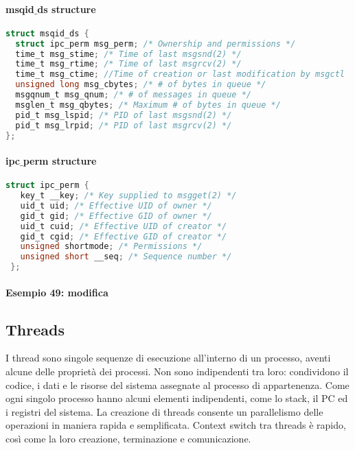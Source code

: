             \paragraph{msqid$\_$ds structure}\hfill \break
        \begin{lstlisting}[language=C]
struct msqid_ds {
  struct ipc_perm msg_perm; /* Ownership and permissions */
  time_t msg_stime; /* Time of last msgsnd(2) */
  time_t msg_rtime; /* Time of last msgrcv(2) */
  time_t msg_ctime; //Time of creation or last modification by msgctl
  unsigned long msg_cbytes; /* # of bytes in queue */
  msgqnum_t msg_qnum; /* # of messages in queue */
  msglen_t msg_qbytes; /* Maximum # of bytes in queue */
  pid_t msg_lspid; /* PID of last msgsnd(2) */
  pid_t msg_lrpid; /* PID of last msgrcv(2) */
};
        \end{lstlisting}
            \paragraph{ipc$\_$perm structure}\hfill \break
        \begin{lstlisting}[language=C]
 struct ipc_perm {
   key_t __key; /* Key supplied to msgget(2) */
   uid_t uid; /* Effective UID of owner */
   gid_t gid; /* Effective GID of owner */
   uid_t cuid; /* Effective UID of creator */
   gid_t cgid; /* Effective GID of creator */
   unsigned shortmode; /* Permissions */
   unsigned short __seq; /* Sequence number */
 };     
        \end{lstlisting}
        \paragraph{Esempio 49: modifica}\hfill \break
        
    \subsection{Threads}
    I thread sono singole sequenze di esecuzione all'interno di un processo, aventi alcune delle proprietà dei processi. Non sono indipendenti tra loro: condividono il codice, i dati e le risorse del sistema assegnate al processo di appartenenza. Come ogni singolo processo hanno alcuni elementi indipendenti, come lo stack, il PC ed i registri del sistema. La creazione di threads consente un parallelismo delle operazioni in maniera rapida e semplificata. Context switch tra threads è rapido, così come la loro creazione, terminazione e comunicazione.
    
